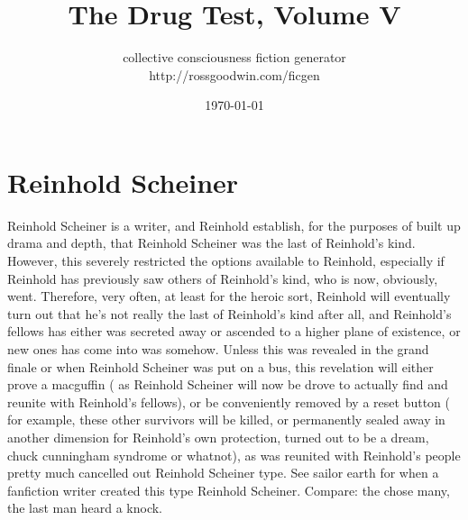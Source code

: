 \documentclass[12pt]{book}
\title{The Drug Test, Volume V}
\author{collective consciousness fiction generator\\http://rossgoodwin.com/ficgen}
\date{\today}
\begin{document}
\maketitle



\chapter{Reinhold Scheiner}

Reinhold Scheiner is a writer, and Reinhold establish, for the purposes of built up drama and depth, that Reinhold Scheiner was the last of Reinhold's kind. However, this severely restricted the options available to Reinhold, especially if Reinhold has previously saw others of Reinhold's kind, who is now, obviously, went. Therefore, very often, at least for the heroic sort, Reinhold will eventually turn out that he's not really the last of Reinhold's kind after all, and Reinhold's fellows has either was secreted away or ascended to a higher plane of existence, or new ones has come into was somehow. Unless this was revealed in the grand finale or when Reinhold Scheiner was put on a bus, this revelation will either prove a macguffin ( as Reinhold Scheiner will now be drove to actually find and reunite with Reinhold's fellows), or be conveniently removed by a reset button ( for example, these other survivors will be killed, or permanently sealed away in another dimension for Reinhold's own protection, turned out to be a dream, chuck cunningham syndrome or whatnot), as was reunited with Reinhold's people pretty much cancelled out Reinhold Scheiner type. See sailor earth for when a fanfiction writer created this type Reinhold Scheiner. Compare: the chose many, the last man heard a knock.
\end{document}
